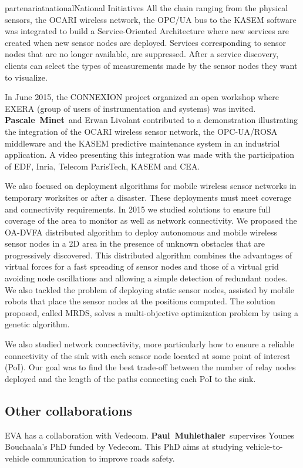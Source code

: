 \documentclass{ra2016}
\newcommand{\paul}  {\textbf{Paul~Muhlethaler}}
\newcommand{\pascale} {\textbf{Pascale~Minet}}
\begin{document}
\begin{module}{partenariat}{national}{National Initiatives}
All the chain ranging from the physical sensors, the OCARI wireless network, the OPC/UA bus to the KASEM software was integrated to build a Service-Oriented Architecture where new services are created when new sensor nodes are deployed. Services corresponding to sensor nodes that are no longer available, are suppressed. After a service discovery, clients can select the types of measurements made by the sensor nodes they want to visualize.

In June 2015, the CONNEXION project organized an open workshop where EXERA (group of users of instrumentation and systems) was invited.  \pascale~and Erwan Livolant contributed to a demonstration illustrating the integration of the OCARI wireless sensor network, the OPC-UA/ROSA middleware and the KASEM predictive maintenance system in an industrial application. A video presenting this integration was made with the participation of EDF, Inria, Telecom ParisTech, KASEM and CEA.

We also focused on deployment algorithms for mobile wireless sensor networks in temporary worksites or after a disaster. These deployments must meet coverage and connectivity requirements. In 2015 we studied solutions to ensure full coverage of the area to monitor as well as network connectivity. We proposed the OA-DVFA distributed algorithm to deploy autonomous and mobile wireless sensor nodes in a 2D area in the presence of unknown obstacles that are progressively discovered. This distributed algorithm combines the advantages of virtual forces for a fast spreading of sensor nodes and those of a virtual grid avoiding node oscillations and allowing a simple detection of redundant nodes. We also tackled the problem of deploying static sensor nodes, assisted by mobile robots that place the sensor nodes at the positions computed. The solution proposed, called MRDS, solves a multi-objective optimization problem by using a genetic algorithm.

We also studied network connectivity, more particularly how to ensure a reliable connectivity of the sink with each sensor node located at some point of interest (PoI). Our goal was to find the best trade-off between the number of relay nodes deployed and the length of the paths connecting each PoI to the sink.

\subsection{Other collaborations}

EVA has a collaboration with Vedecom. 
\paul~supervises Younes Bouchaala's PhD funded by Vedecom. This PhD aims at 
studying vehicle-to-vehicle communication to improve roads safety. 

\end{module} 
\end{document}
